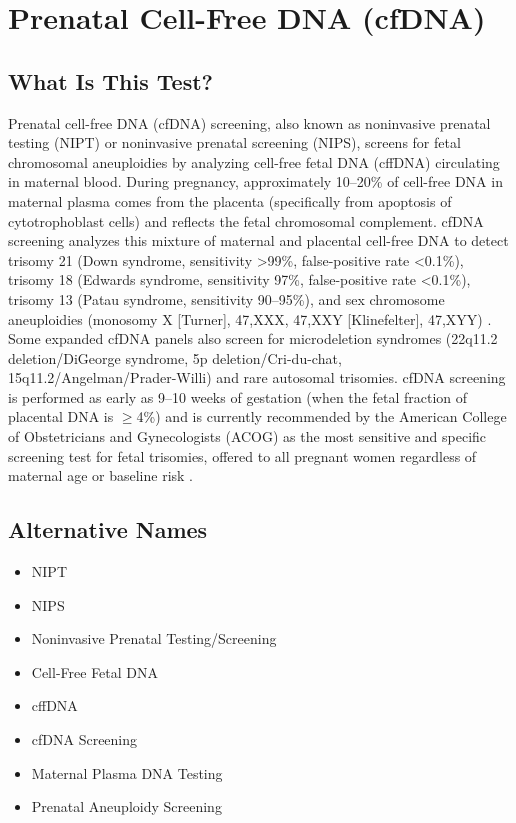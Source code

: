 \chapter{Prenatal Cell-Free DNA (cfDNA)}

\section*{What Is This Test?}
Prenatal cell-free DNA (cfDNA) screening, also known as noninvasive prenatal testing (NIPT) or noninvasive prenatal screening (NIPS), screens for fetal chromosomal aneuploidies by analyzing cell-free fetal DNA (cffDNA) circulating in maternal blood. During pregnancy, approximately 10--20\% of cell-free DNA in maternal plasma comes from the placenta (specifically from apoptosis of cytotrophoblast cells) and reflects the fetal chromosomal complement. cfDNA screening analyzes this mixture of maternal and placental cell-free DNA to detect trisomy 21 (Down syndrome, sensitivity >99\%, false-positive rate <0.1\%), trisomy 18 (Edwards syndrome, sensitivity 97\%, false-positive rate <0.1\%), trisomy 13 (Patau syndrome, sensitivity 90--95\%), and sex chromosome aneuploidies (monosomy X [Turner], 47,XXX, 47,XXY [Klinefelter], 47,XYY) \cite{gil2017analysis,norton2015cellfree}. Some expanded cfDNA panels also screen for microdeletion syndromes (22q11.2 deletion/DiGeorge syndrome, 5p deletion/Cri-du-chat, 15q11.2/Angelman/Prader-Willi) and rare autosomal trisomies. cfDNA screening is performed as early as 9--10 weeks of gestation (when the fetal fraction of placental DNA is $\geq$4\%) and is currently recommended by the American College of Obstetricians and Gynecologists (ACOG) as the most sensitive and specific screening test for fetal trisomies, offered to all pregnant women regardless of maternal age or baseline risk \cite{acog2020screening}.

\section*{Alternative Names}
\begin{itemize}
  \item NIPT
  \item NIPS
  \item Noninvasive Prenatal Testing/Screening
  \item Cell-Free Fetal DNA
  \item cffDNA
  \item cfDNA Screening
  \item Maternal Plasma DNA Testing
  \item Prenatal Aneuploidy Screening
\end{itemize}
